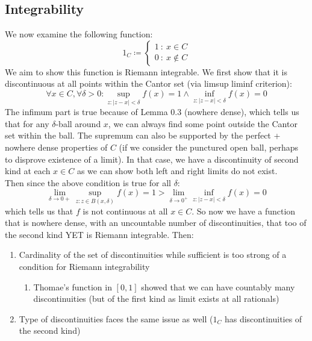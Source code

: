 \documentclass[10pt,letterpaper]{article} %
\begin{document}
\subsection{Integrability}
We now examine the following function:
\begin{equation*}
  1_C \coloneq \begin{cases*}
    1 \ : \ x \in C\\
    0 \ : \ x \notin C
  \end{cases*}
\end{equation*}
We aim to show this function is Riemann integrable. We first show that it is discontinuous at all points within the Cantor set (via limsup liminf criterion):
\begin{equation*}
  \forall x \in C, \forall \delta > 0: \sup_{z: |z - x| < \delta}f(x) = 1 \land \inf_{z: |z - x| < \delta}f(x) = 0
\end{equation*}
The infimum part is true because of Lemma 0.3 (nowhere dense), which tells us that for any $\delta$-ball around $x$, we can always find some point outside the Cantor set within the ball. The supremum can also be supported by the perfect + nowhere dense properties of $C$ (if we consider the punctured open ball, perhaps to disprove existence of a limit). In that case, we have a discontinuity of second kind at each $x \in C$ as we can show both left and right limits do not exist.\\

Then since the above condition is true for all $\delta$:
\begin{equation*}
  \lim_{\delta \xrightarrow{} 0+}\sup_{z: z \in B(x, \delta)}f(x) = 1 > \lim_{\delta \xrightarrow{} 0^+}\inf_{z: |z-x| < \delta}f(x) = 0
\end{equation*}
which tells us that $f$ is not continuous at all $x \in C$. So now we have a function that is nowhere dense, with an uncountable number of discontinuities, that too of the second kind YET is Riemann integrable. Then:
\begin{enumerate}
  \item Cardinality of the set of discontinuities while sufficient is too strong of a condition for Riemann integrability
  \begin{enumerate}
    \item Thomae's function in $[0, 1]$ showed that we can have countably many discontinuities (but of the first kind as limit exists at all rationals)
  \end{enumerate}
  \item Type of discontinuities faces the same issue as well ($1_C$ has discontinuities of the second kind)
\end{enumerate}
\end{document}
